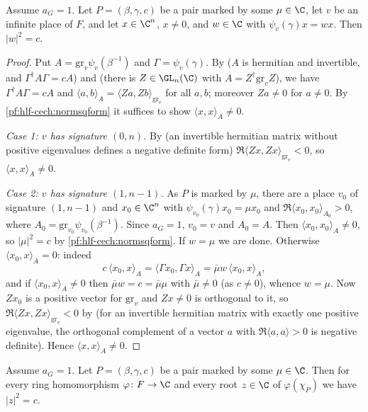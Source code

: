 \begin{lemma}\label{pf:hlf-cech:normsqeig}
Assume $a_G=1$. Let $P=(\beta,\gamma,c)$ be a pair marked by some $\mu\in\C$, let $v$ be an infinite place of $F$, and let $x\in\C^n$,
$x\ne0$, and $w\in\C$ with $\psi_v(\gamma)x=wx$. Then $|w|^2=c$.
\end{lemma}

\begin{proof}
Put $A=\mathrm{gr}_v\psi_v(\beta^{-1})$ and $\Gamma=\psi_v(\gamma)$. By  ($A$ is hermitian and
invertible, and $\Gamma^\dagger A\Gamma=cA$) and  (there is $Z\in\GL_n(\C)$ with
$A=Z^\dagger\mathrm{gr}_vZ$), we have $\Gamma^\dagger A\Gamma=cA$ and $\langle a,b\rangle_A=\langle Za,Zb\rangle_{\mathrm{gr}_v}$ for all $a,b$;
moreover $Za\ne0$ for $a\ne0$. By \cref{pf:hlf-cech:normsqform} it suffices to show $\langle x,x\rangle_A\ne0$.

\emph{Case 1: $v$ has signature $(0,n)$.} By  (an invertible hermitian matrix without
positive eigenvalues defines a negative definite form) $\Re\langle Zx,Zx\rangle_{\mathrm{gr}_v}<0$, so $\langle x,x\rangle_A\ne0$.

\emph{Case 2: $v$ has signature $(1,n-1)$.} As $P$ is marked by $\mu$, there are a place $v_0$ of signature $(1,n-1)$ and $x_0\in\C^n$
with $\psi_{v_0}(\gamma)x_0=\mu x_0$ and $\Re\langle x_0,x_0\rangle_{A_0}>0$, where $A_0=\mathrm{gr}_{v_0}\psi_{v_0}(\beta^{-1})$. Since $a_G=1$,
$v_0=v$ and $A_0=A$. Then $\langle x_0,x_0\rangle_A\ne0$, so $|\mu|^2=c$ by \cref{pf:hlf-cech:normsqform}. If $w=\mu$ we are done. Otherwise
$\langle x_0,x\rangle_A=0$: indeed
\[
  c\,\langle x_0,x\rangle_A=\langle\Gamma x_0,\Gamma x\rangle_A=\bar\mu w\,\langle x_0,x\rangle_A,
\]
and if $\langle x_0,x\rangle_A\ne0$ then $\bar\mu w=c=\bar\mu\mu$ with $\bar\mu\ne0$ (as $c\ne0$), whence $w=\mu$. Now $Zx_0$ is a
positive vector for $\mathrm{gr}_v$ and $Zx\ne0$ is orthogonal to it, so $\Re\langle Zx,Zx\rangle_{\mathrm{gr}_v}<0$ by
 (for an invertible hermitian matrix with exactly one positive eigenvalue,
the orthogonal complement of a vector $a$ with $\Re\langle a,a\rangle>0$ is negative definite). Hence $\langle x,x\rangle_A\ne0$.
\end{proof}

\begin{lemma}\label{pf:hlf-cech:markell}
Assume $a_G=1$. Let $P=(\beta,\gamma,c)$ be a pair marked by some $\mu\in\C$. Then for every ring homomorphism $\varphi\colon F\to\C$ and
every root $z\in\C$ of $\varphi(\chi_P)$ we have $|z|^2=c$.
\end{lemma}

